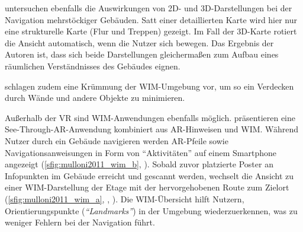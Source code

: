\textcite{Li2013} untersuchen ebenfalls die Auswirkungen von 2D- und 3D-Dar\-stel\-lun\-gen bei der Navigation mehrstöckiger Gebäuden.
Satt einer detaillierten Karte wird hier nur eine strukturelle Karte (Flur und Treppen) gezeigt.
Im Fall der 3D-Karte rotiert die Ansicht automatisch, wenn die Nutzer sich bewegen.
Das Ergebnis der Autoren ist, dass sich beide Darstellungen gleichermaßen zum Aufbau eines räumlichen Verständnisses des Gebäudes eignen.

\textcite{Vallance2001} schlagen zudem eine Krümmung der WIM-Umgebung vor, um so ein Verdecken durch Wände und andere Objekte zu minimieren.

Außerhalb der VR sind WIM-Anwendungen ebenfalls möglich.
\textcites{Mulloni2011a}{Mulloni2012} präsentieren eine See-Through-AR-Anwendung kombiniert aus AR-Hinweisen und WIM.
Während Nutzer durch ein Gebäude navigieren werden AR-Pfeile sowie Navigationsanweisungen in Form von \enquote{Aktivitäten} auf einem Smartphone angezeigt (\autoref{sfig:mulloni2011_wim_b}, ).
Sobald zuvor platzierte Poster an Infopunkten im Gebäude erreicht und gescannt werden, wechselt die Ansicht zu einer WIM-Darstellung der Etage mit der hervorgehobenen Route zum Zielort (\autoref{sfig:mulloni2011_wim_a}, , ).
Die WIM-Übersicht hilft Nutzern, Orientierungspunkte (\emph{\enquote{Landmarks}}) in der Umgebung wiederzuerkennen, was zu weniger Fehlern bei der Navigation führt.

